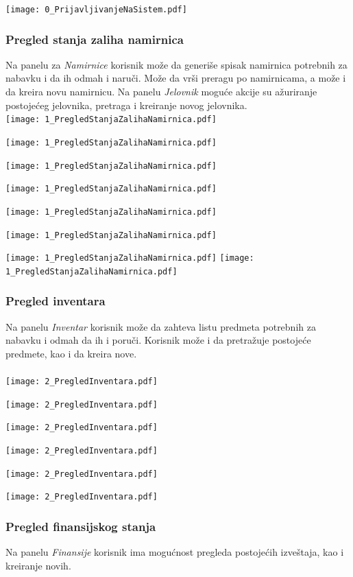 \documentclass{article}
\begin{document}
\texttt{[image: 0\_PrijavljivanjeNaSistem.pdf]}



\subsubsection{Pregled stanja zaliha namirnica}
Na panelu za \emph{Namirnice} korisnik može da generiše spisak namirnica potrebnih za nabavku i da ih odmah i naruči. Može da vrši preragu po namirnicama, a može i da kreira novu namirnicu. Na panelu \emph{Jelovnik} moguće akcije su ažuriranje postojećeg jelovnika, pretraga i kreiranje novog jelovnika.\\

\texttt{[image: 1\_PregledStanjaZalihaNamirnica.pdf]}

\texttt{[image: 1\_PregledStanjaZalihaNamirnica.pdf]}

\texttt{[image: 1\_PregledStanjaZalihaNamirnica.pdf]}

\texttt{[image: 1\_PregledStanjaZalihaNamirnica.pdf]}

\texttt{[image: 1\_PregledStanjaZalihaNamirnica.pdf]}
\vfill

\texttt{[image: 1\_PregledStanjaZalihaNamirnica.pdf]}
\vfill

\texttt{[image: 1\_PregledStanjaZalihaNamirnica.pdf]}
\vfill
\texttt{[image: 1\_PregledStanjaZalihaNamirnica.pdf]}
\vfill

\subsubsection{Pregled inventara}
Na panelu \emph{Inventar} korisnik može da zahteva listu predmeta potrebnih za nabavku i odmah da ih i poruči. Korisnik može i da pretražuje postojeće predmete, kao i da kreira nove.\\\\

\texttt{[image: 2\_PregledInventara.pdf]}


\texttt{[image: 2\_PregledInventara.pdf]}

\texttt{[image: 2\_PregledInventara.pdf]}

\texttt{[image: 2\_PregledInventara.pdf]}

\texttt{[image: 2\_PregledInventara.pdf]}

\texttt{[image: 2\_PregledInventara.pdf]}

\newpage
\subsubsection{Pregled finansijskog stanja}
Na panelu \emph{Finansije} korisnik ima mogućnost pregleda postojećih izveštaja, kao i kreiranje novih.\\\\
\end{document}
